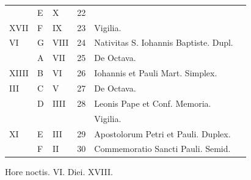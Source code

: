 \begin{center}
\begin{tabular}{l | l | l | r | l l}
\color{Red}  & E & \color{Red} X & 22 & & \color{Red} \\
\color{Red} XVII & F & \color{Red} IX & 23 & \qquad Vigilia. \color{Red} \\
\color{Red} VI & G & \color{Red} VIII & 24 & Nativitas S. Iohannis Baptiste. Dupl. \\
\color{Red}  & \color{Red} A & \color{Red} VII & 25 & De Octava. & \color{Red} \\
\color{Red} XIIII & B & \color{Red} VI & 26 & Iohannis et Pauli Mart. Simplex. & \color{Red} \\
\color{Red} III & C & \color{Red} V & 27 & De Octava. & \color{Red} \\
\color{Red}  & D & \color{Red} IIII & 28 & Leonis Pape et Conf. Memoria. \\
 &  &  &  & \qquad Vigilia. \color{Red} \\
\color{Red} XI & E & \color{Red} III & 29 & Apostolorum Petri et Pauli. Duplex. & \color{Red} \\
\color{Red}  & F & \color{Red} II & 30 & Commemoratio Sancti Pauli. \color{Red} Semid. \\
\end{tabular}
\newline \color{Red} Hore noctis. VI. Diei. XVIII.
\end{center}



\newpage
\color{Red}\color{black}


